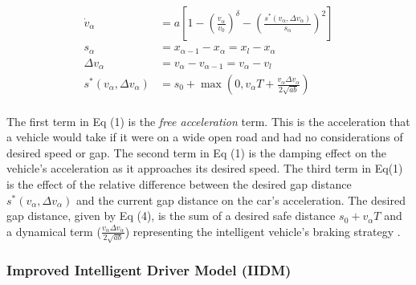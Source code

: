 \documentclass[12pt]{article}
\begin{document}
\begin{mymathbox}[ams gather, title=IDM Governing Equations, colframe=blue!30!black]
  \begin{align}
  \dot{v}_\alpha &= a \left[1 - \left(\frac{v_\alpha}{v_0}\right)^{\delta} - \left(\frac{s^*(v_\alpha,\Delta v_\alpha)}{s_\alpha}\right)^{2}\right]\\
  s_\alpha &= x_{\alpha-1}-x_\alpha=x_{l}-x_\alpha\\
  \Delta v_\alpha &=v_\alpha-v_{\alpha-1}=v_\alpha-v_l\\
  s^*(v_\alpha, \Delta v_\alpha) &= s_0 + \max\left(0, v_\alpha T + \frac{v_\alpha \Delta v_\alpha}{2 \sqrt{ab}} \right)
  \end{align}
\end{mymathbox}
\paragraph{}
The first term in Eq (1) is the \textit{free acceleration} term. This is the acceleration that a vehicle would take if it were on a wide open road and had no considerations of desired speed or gap.  The second term in Eq (1) is the damping effect on the vehicle's acceleration as it approaches its desired speed.  The third term in Eq(1) is the effect of the relative difference between the desired gap distance $s^*(v_\alpha,\Delta v_\alpha)$ and the current gap distance on the car's acceleration.  The desired gap distance, given by Eq (4), is the sum of a desired safe distance $s_0+v_\alpha T$ and a dynamical term ($\frac{v_\alpha \Delta v_\alpha}{2 \sqrt{ab}}$) representing the intelligent vehicle's braking strategy \cite{intelligent_driver_model}.

\subsubsection{Improved Intelligent Driver Model (IIDM)}
\end{document}
